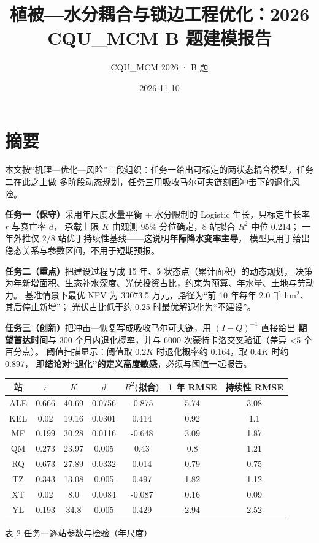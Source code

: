 \documentclass[11pt,a4paper]{ctexart}
\title{植被—水分耦合与锁边工程优化：2026 CQU\_MCM B 题建模报告}
\author{CQU\_MCM 2026 · B 题}
\date{2026-11-10}
\begin{document}
\maketitle
\thispagestyle{empty}
\newpage

\section*{摘\quad 要}
本文按“机理—优化—风险”三段组织：任务一给出可标定的两状态耦合模型，任务二在此之上做
多阶段动态规划，任务三用吸收马尔可夫链刻画冲击下的退化风险。

\textbf{任务一（保守）}采用年尺度水量平衡 + 水分限制的 Logistic 生长，只标定生长率 $r$ 与衰亡率 $d$，
承载上限 $K$ 由观测 95\% 分位确定，8 站拟合 $R^2$ 中位 0.214；
一年外推仅 2/8 站优于持续性基线——这说明\textbf{年际降水变率主导}，
模型只用于给出稳态关系与参数区间，不用于短期预报。

\textbf{任务二（重点）}把建设过程写成 15 年、5 状态点（累计面积）的动态规划，
决策为年新增面积、生态补水深度、光伏投资占比，约束为预算、年水量、土地与劳动力。
基准情景下最优 NPV 为 33073.5 万元，路径为“前 10 年每年 2.0 千 hm$^2$、其后停止新增”；
光伏占比低于约 0.25 时最优解退化为“不建设”。

\textbf{任务三（创新）}把冲击—恢复写成吸收马尔可夫链，用 $(I-Q)^{-1}$ 直接给出
\textbf{期望首达时间}与 300 个月内退化概率，并与 6000 次蒙特卡洛交叉验证（差异 <5 个百分点）。
阈值扫描显示：阈值取 $0.2K$ 时退化概率约 0.164，取 $0.4K$ 时约 0.897，
即\textbf{结论对“退化”的定义高度敏感}，必须与阈值一起报告。

\begin{table}[H]\centering\small
\begin{tabular}{|c|c|c|c|c|c|c|}
\toprule
站 & $r$ & $K$ & $d$ & $R^2$(拟合) & 1 年 RMSE & 持续性 RMSE \\
\midrule
ALE & 0.666 & 40.69 & 0.0756 & -0.875 & 5.74 & 3.08 \\
KEL & 0.02 & 19.16 & 0.0301 & 0.414 & 0.92 & 1.1 \\
MF & 0.199 & 30.28 & 0.0116 & -0.648 & 3.09 & 1.87 \\
QM & 0.273 & 23.97 & 0.005 & 0.43 & 0.8 & 1.21 \\
RQ & 0.673 & 27.89 & 0.0332 & 0.014 & 0.79 & 0.75 \\
TZ & 0.343 & 13.08 & 0.005 & 0.497 & 1.82 & 1.12 \\
XT & 0.02 & 8.0 & 0.0084 & -0.087 & 0.16 & 0.09 \\
YL & 0.193 & 34.8 & 0.005 & 0.429 & 2.94 & 2.52 \\
\bottomrule
\end{tabular}
\begin{center}\small 表 2  任务一逐站参数与检验（年尺度）\end{center}
\end{table}
\end{document}
